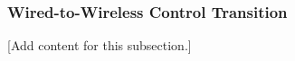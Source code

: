 
\subsubsection{Wired-to-Wireless Control Transition}
\label{subsubsec:design_2_8_2_wired_to_wireless_transition}

[Add content for this subsection.]
